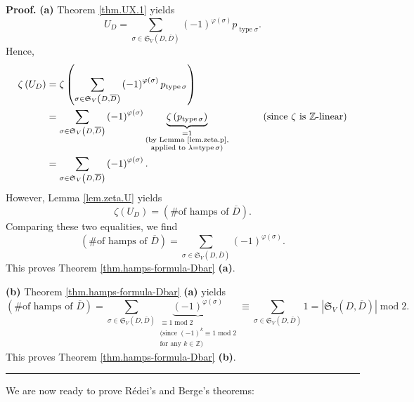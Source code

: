 \documentclass[numbers=enddot,12pt,final,onecolumn,notitlepage]{scrartcl}%
\numberwithin{exer}{section}
\theoremstyle{definition}
\newenvironment{proof}[1][Proof]{\noindent\textbf{#1.} }{\ \rule{0.5em}{0.5em}}
\let\sumnonlimits\sum
\renewcommand{\sum}{\sumnonlimits\limits}
\begin{document}
\begin{proof}
\textbf{(a)} Theorem \ref{thm.UX.1} yields%
\[
U_{D}=\sum_{\sigma\in\mathfrak{S}_{V}\left(  D,\overline{D}\right)  }\left(
-1\right)  ^{\varphi\left(  \sigma\right)  }p_{\operatorname*{type}\sigma}.
\]
Hence,%
\begin{align*}
\zeta\left(  U_{D}\right)   &  =\zeta\left(  \sum_{\sigma\in\mathfrak{S}%
_{V}\left(  D,\overline{D}\right)  }\left(  -1\right)  ^{\varphi\left(
\sigma\right)  }p_{\operatorname*{type}\sigma}\right) \\
&  =\sum_{\sigma\in\mathfrak{S}_{V}\left(  D,\overline{D}\right)  }\left(
-1\right)  ^{\varphi\left(  \sigma\right)  }\underbrace{\zeta\left(
p_{\operatorname*{type}\sigma}\right)  }_{\substack{=1\\\text{(by Lemma
\ref{lem.zeta.p},}\\\text{applied to }\lambda=\operatorname*{type}%
\sigma\text{)}}}\ \ \ \ \ \ \ \ \ \ \left(  \text{since }\zeta\text{ is
}\mathbb{Z}\text{-linear}\right) \\
&  =\sum_{\sigma\in\mathfrak{S}_{V}\left(  D,\overline{D}\right)  }\left(
-1\right)  ^{\varphi\left(  \sigma\right)  }.
\end{align*}
However, Lemma \ref{lem.zeta.U} yields%
\[
\zeta\left(  U_{D}\right)  =\left(  \text{\# of hamps of }\overline{D}\right)
.
\]
Comparing these two equalities, we find%
\[
\left(  \text{\# of hamps of }\overline{D}\right)  =\sum_{\sigma
\in\mathfrak{S}_{V}\left(  D,\overline{D}\right)  }\left(  -1\right)
^{\varphi\left(  \sigma\right)  }.
\]
This proves Theorem \ref{thm.hamps-formula-Dbar} \textbf{(a)}.

\textbf{(b)} Theorem \ref{thm.hamps-formula-Dbar} \textbf{(a)} yields%
\[
\left(  \text{\# of hamps of }\overline{D}\right)  =\sum_{\sigma
\in\mathfrak{S}_{V}\left(  D,\overline{D}\right)  }\underbrace{\left(
-1\right)  ^{\varphi\left(  \sigma\right)  }}_{\substack{\equiv
1\operatorname{mod}2\\\text{(since }\left(  -1\right)  ^{k}\equiv
1\operatorname{mod}2\\\text{for any }k\in\mathbb{Z}\text{)}}}\equiv
\sum_{\sigma\in\mathfrak{S}_{V}\left(  D,\overline{D}\right)  }1=\left\vert
\mathfrak{S}_{V}\left(  D,\overline{D}\right)  \right\vert \operatorname{mod}%
2.
\]
This proves Theorem \ref{thm.hamps-formula-Dbar} \textbf{(b)}.
\end{proof}

We are now ready to prove R\'{e}dei's and Berge's theorems:
\end{document}
